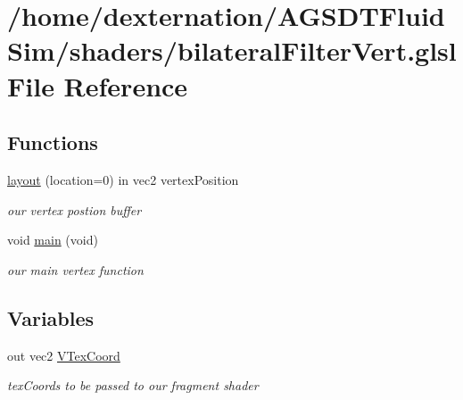 \hypertarget{bilateral_filter_vert_8glsl}{\section{/home/dexternation/\-A\-G\-S\-D\-T\-Fluid\-Sim/shaders/bilateral\-Filter\-Vert.glsl File Reference}
\label{bilateral_filter_vert_8glsl}
}
\subsection*{Functions}
\begin{DoxyCompactItemize}
\item 
\hyperlink{bilateral_filter_vert_8glsl_a76e82f4a2abee8cef9ec3419ca1ad185}{layout} (location=0) in vec2 vertex\-Position
\begin{DoxyCompactList}\small\item\em our vertex postion buffer \end{DoxyCompactList}\item 
\hypertarget{bilateral_filter_vert_8glsl_a6288eba0f8e8ad3ab1544ad731eb7667}{void \hyperlink{bilateral_filter_vert_8glsl_a6288eba0f8e8ad3ab1544ad731eb7667}{main} (void)}\label{bilateral_filter_vert_8glsl_a6288eba0f8e8ad3ab1544ad731eb7667}

\begin{DoxyCompactList}\small\item\em our main vertex function \end{DoxyCompactList}\end{DoxyCompactItemize}
\subsection*{Variables}
\begin{DoxyCompactItemize}
\item 
\hypertarget{bilateral_filter_vert_8glsl_a849580e4568e3dc8125d8e541b50a483}{out vec2 \hyperlink{bilateral_filter_vert_8glsl_a849580e4568e3dc8125d8e541b50a483}{V\-Tex\-Coord}}\label{bilateral_filter_vert_8glsl_a849580e4568e3dc8125d8e541b50a483}

\begin{DoxyCompactList}\small\item\em tex\-Coords to be passed to our fragment shader \end{DoxyCompactList}\end{DoxyCompactItemize}


